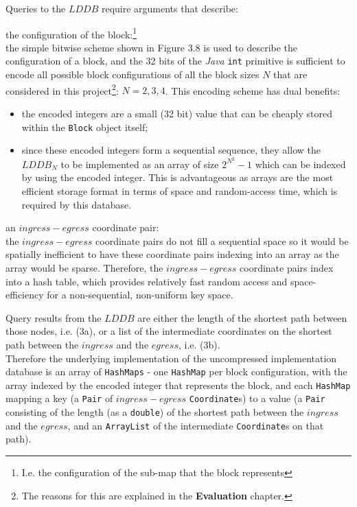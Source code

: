 \documentclass[12pt,notitlepage]{report}
\begin{document}
\noindent
Queries to the $LDDB$ require arguments that describe:
\begin{description} 
\item{the configuration of the block:\footnote{I.e. the configuration of the sub-map that the block represents}}\\
the simple bitwise scheme shown in Figure 3.8 is used to describe the configuration of a block, and the 32 bits of the {\em Java} {\tt int} primitive is sufficient to encode all possible block configurations of all the block sizes $N$ that are considered in this project\footnote{The reasons for this are explained in the {\bfseries Evaluation} chapter.}: $N=2, 3, 4$. This encoding scheme has dual benefits:
\begin{itemize}
\item the encoded integers are a small (32 bit) value that can be cheaply stored within the {\tt Block} object itself;
\item since these encoded integers form a sequential sequence, they allow the $LDDB_{N}$ to be implemented as an array of size $2^{N^{2}}-1$ which can be indexed by using the encoded integer. This is advantageous as arrays are the most efficient storage format in terms of space and random-access time, which is required by this database.
\end{itemize}


\item{an $ingress-egress$ coordinate pair}:\\
the $ingress-egress$ coordinate pairs do not fill a sequential space so it would be spatially inefficient to have these coordinate pairs indexing into an array as the array would be sparse. Therefore, the $ingress-egress$ coordinate pairs index into a hash table, which provides relatively fast random access and space-efficiency for a non-sequential, non-uniform key space.\\

\end{description}

\noindent
Query results from the $LDDB$ are either the length of the shortest path between those nodes, i.e. (3a), or a list of the intermediate coordinates on the shortest path between the $ingress$ and the $egress$, i.e. (3b).\\

\noindent
Therefore the underlying implementation of the uncompressed implementation database is an array of {\tt  HashMaps} - one {\tt HashMap} per block configuration, with the array indexed by the encoded integer that represents the block, and each {\tt HashMap} mapping a key (a {\tt Pair} of $ingress-egress$ {\tt Coordinate}s) to a value (a {\tt Pair} consisting of the length (as a {\tt double}) of the shortest path between the $ingress$ and the $egress$, and an {\tt ArrayList} of the intermediate {\tt Coordinate}s on that path).\\
\end{document}
